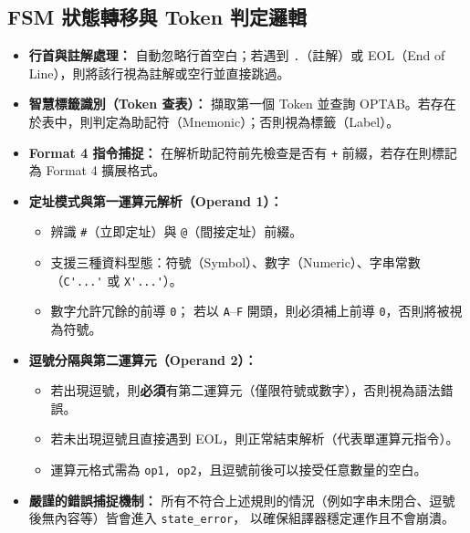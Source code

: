 \subsection{FSM 狀態轉移與 Token 判定邏輯}

\begin{itemize}
    \item \textbf{行首與註解處理：}
          自動忽略行首空白；若遇到 \lstinline{.}（註解）或 EOL（End of Line），則將該行視為註解或空行並直接跳過。

    \item \textbf{智慧標籤識別（Token 查表）：}
          擷取第一個 Token 並查詢 OPTAB。若存在於表中，則判定為助記符（Mnemonic）；否則視為標籤（Label）。

    \item \textbf{Format 4 指令捕捉：}
          在解析助記符前先檢查是否有 \lstinline{+} 前綴，若存在則標記為 Format 4 擴展格式。

    \item \textbf{定址模式與第一運算元解析（Operand 1）：}
          \begin{itemize}
              \item 辨識 \lstinline{#}（立即定址）與 \lstinline{@}（間接定址）前綴。
              \item 支援三種資料型態：符號（Symbol）、數字（Numeric）、字串常數（\lstinline{C'...'} 或 \lstinline{X'...'}）。
              \item 數字允許冗餘的前導 \lstinline{0}；
                    若以 \lstinline{A}--\lstinline{F} 開頭，則必須補上前導 \lstinline{0}，否則將被視為符號。
          \end{itemize}

    \item \textbf{逗號分隔與第二運算元（Operand 2）：}
          \begin{itemize}
              \item 若出現逗號，則\textbf{必須}有第二運算元（僅限符號或數字），否則視為語法錯誤。
              \item 若未出現逗號且直接遇到 EOL，則正常結束解析（代表單運算元指令）。
              \item 運算元格式需為 \lstinline{op1, op2}，且逗號前後可以接受任意數量的空白。
          \end{itemize}

    \item \textbf{嚴謹的錯誤捕捉機制：}
          所有不符合上述規則的情況（例如字串未閉合、逗號後無內容等）皆會進入 \lstinline{state_error}，
          以確保組譯器穩定運作且不會崩潰。
\end{itemize}



